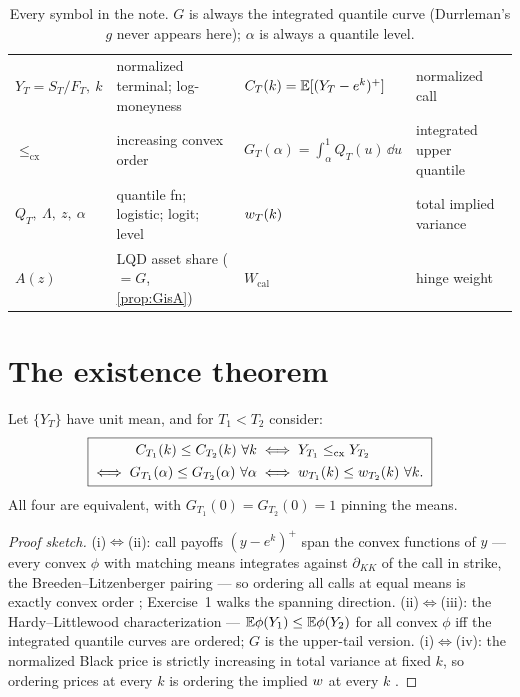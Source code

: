 \documentclass[11pt]{article}
\newcommand{\cx}{\le_{\mathrm{cx}}}
\newcommand{\Lo}{\Lambda}
\begin{document}
\begin{table}[H]
\centering\footnotesize
\setlength{\tabcolsep}{3pt}
\begin{tabular}{@{}llll@{}}
\toprule
$Y_T=S_T/F_T,\ k$ & normalized terminal; log-moneyness &
$C_T(k)=\mathbb{E}[(Y_T-e^{k})^{+}]$ & normalized call\\[2pt]
$\cx$ & increasing convex order &
$G_T(\alpha)=\int_\alpha^1 Q_T(u)\,\dd u$ & integrated upper quantile\\[2pt]
$Q_T,\ \Lo,\ z,\ \alpha$ & quantile fn; logistic; logit; level &
$w_T(k)$ & total implied variance\\[2pt]
$A(z)$ & LQD asset share ($=G$, \cref{prop:GisA}) &
$W_{\mathrm{cal}}$ & hinge weight\\
\bottomrule
\end{tabular}
\caption{Every symbol in the note.  $G$ is always the integrated
quantile curve (Durrleman's $g$ never appears here); $\alpha$ is always
a quantile level.}
\label{tab:ledger}
\end{table}

\section{The existence theorem}
\label{sec:exist}

\begin{theorem}
\label{thm:faces}
Let $\{Y_T\}$ have unit mean, and for $T_1<T_2$ consider:
\begin{equation}
\boxed{\;
\begin{aligned}
C_{T_1}(k)\le C_{T_2}(k)\ \forall k
\;&\Longleftrightarrow\;
Y_{T_1}\cx Y_{T_2}\\[1pt]
\Longleftrightarrow\;
G_{T_1}(\alpha)\le G_{T_2}(\alpha)\ \forall\alpha
\;&\Longleftrightarrow\;
\tvar_{T_1}(k)\le \tvar_{T_2}(k)\ \forall k .
\end{aligned}
\;}
\label{eq:faces}
\end{equation}
All four are equivalent, with $G_{T_1}(0)=G_{T_2}(0)=1$ pinning the
means.
\end{theorem}

\begin{proof}[Proof sketch]
(i)$\Leftrightarrow$(ii): call payoffs $(y-e^{k})^{+}$ span the convex
functions of $y$ --- every convex $\phi$ with matching means integrates
against $\partial_{KK}$ of the call in strike, the
Breeden--Litzenberger pairing --- so ordering all calls at equal means
is exactly convex order \cite{Strassen1965,CarrMadan2005}; Exercise~1
walks the spanning direction.
(ii)$\Leftrightarrow$(iii): the Hardy--Littlewood characterization ---
$\mathbb{E}\phi(Y_1)\le\mathbb{E}\phi(Y_2)$ for all convex $\phi$ iff the integrated
quantile curves are ordered; $G$ is the upper-tail version.
(i)$\Leftrightarrow$(iv): the normalized Black price is strictly
increasing in total variance at fixed $k$, so ordering prices at every
$k$ is ordering the implied $w$ at every $k$
\cite{GatheralJacquier2014}.
\end{proof}
\end{document}
